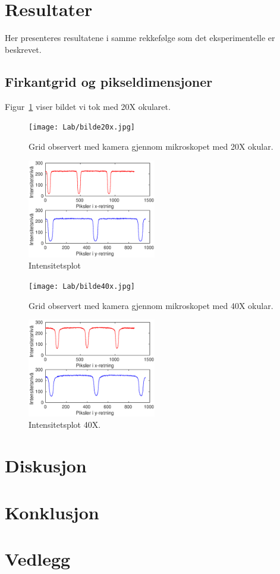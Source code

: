 \documentclass[a4paper,11pt, twocolumn]{article}
\begin{document}
\section{Resultater}
Her presenteres resultatene i samme rekkefølge som det eksperimentelle er beskrevet.
\subsection{Firkantgrid og pikseldimensjoner}
Figur~\ref{fig:grid20x} viser bildet vi tok med 20X okularet.
\begin{figure}[!ht]
	\centering
	\texttt{[image: Lab/bilde20x.jpg]}
	\caption{Grid observert med kamera gjennom mikroskopet med 20X okular.}
	\label{fig:grid20x}
\end{figure}

\begin{figure}[!ht]
	\centering
	\includegraphics[width=0.5\textwidth]{Lab/gitter20x.eps}
	\caption{Intensitetsplot}
	\label{fig:intensitet20x}
\end{figure}
\begin{figure}[!ht]
	\centering
	\texttt{[image: Lab/bilde40x.jpg]}
	\caption{Grid observert med kamera gjennom mikroskopet med 40X okular.}
	\label{fig:grid40x}
\end{figure}

\begin{figure}[!ht]
	\centering
	\includegraphics[width = 0.5\textwidth]{Lab/gitter40x.eps}
	\caption{Intensitetsplot 40X.}
	\label{fig:intensitet40x}
\end{figure}
\section{Diskusjon}

\section{Konklusjon}

\printbibliography{}
\clearpage
\onecolumn
\appendix

\section{Vedlegg}
\end{document}
